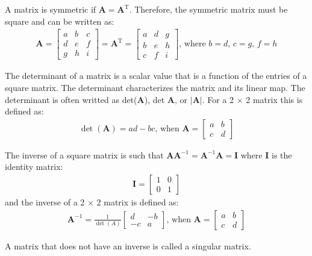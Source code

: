 \documentclass[12pt,letter]{article}
\begin{document}
\begin{review}
	A matrix is symmetric if $\textbf{A} =\textbf{A}^\text{T}$. Therefore, the symmetric matrix must be square and can be written as:
	\begin{eqnarray}
	   \textbf{A} = \begin{bmatrix} a & b &c \\ d & e & f\\ g & h & i \end{bmatrix} = \textbf{A}^\text{T} = \begin{bmatrix} a & d & g \\ b & e & h \\ c & f & i \end{bmatrix}\text{, where } b=d \text{, }c=g\text{, }f=h
	\end{eqnarray}
	
	The determinant of a matrix is a scalar value that is a function of the entries of a square matrix. The determinant characterizes the matrix and its linear map. The determinant is often writted as det($\textbf{A}$), det $\textbf{A}$, or $|\textbf{A}|$. For a 2 $\times$ 2 matrix this is defined as:
	\begin{eqnarray}
	\det (\textbf{A}) = ad-bc  \text{, when } \textbf{A} = \begin{bmatrix} a & b \\ c & d \end{bmatrix}
	\end{eqnarray}
	
	The inverse of a square matrix is such that $\textbf{A}\textbf{A}^{-1} = \textbf{A}^{-1}\textbf{A}=\textbf{I}$ where $\textbf{I}$ is the identity matrix:
	\begin{eqnarray}
	\textbf{I} = \begin{bmatrix} 1 & 0 \\ 0 & 1 \end{bmatrix} 
	\end{eqnarray}
	and the inverse of a 2 $\times$ 2 matrix is defined as:
	\begin{eqnarray}
	\textbf{A}^{-1} = \frac{1}{\det (A)} \begin{bmatrix} d & -b \\ -c & a \end{bmatrix} \text{, when } \textbf{A} = \begin{bmatrix} a & b \\ c & d \end{bmatrix}
	\end{eqnarray}
	
	A matrix that does not have an inverse is called a singular matrix.
	
	
	\end{review}
	
\end{document}
